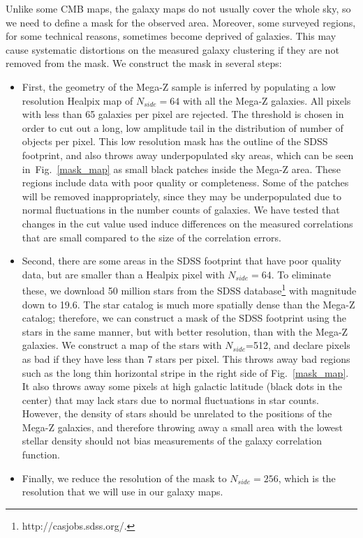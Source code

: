 Unlike some CMB maps, the galaxy maps do not usually cover the whole sky, so we need to define a mask for the observed area. Moreover, some surveyed regions, for some technical reasons, sometimes become deprived of galaxies. This may cause systematic distortions on the measured galaxy clustering if they are not removed from the mask. We construct the mask in several steps:
\begin{itemize}
\item First, the geometry of the Mega-Z sample is inferred by populating a low resolution Healpix map of $N_{side}=64$ with all the Mega-Z galaxies. All pixels with less than 65 galaxies per pixel are rejected.  
The threshold is chosen in order to cut out a long, low amplitude tail in the distribution of number of objects per pixel.
This low resolution mask has the outline of the SDSS footprint, and also throws away underpopulated sky areas, which can be seen in~Fig.~\ref{mask_map} as small black patches inside the Mega-Z area. These regions include data with poor quality or completeness. Some of the patches will be removed inappropriately, since they may be underpopulated due to normal fluctuations in the number counts of galaxies. We have tested that changes in the cut value used induce differences on the measured correlations that are small compared to the size of the correlation errors. 
\item Second, there are some areas in the SDSS footprint that have poor quality data, but are smaller than a Healpix pixel with $N_{side}=64$. To eliminate these, we download 50 million stars from the SDSS database\footnote{http://casjobs.sdss.org/.} with magnitude down to 19.6. The star catalog is much more spatially dense than the Mega-Z catalog;  therefore, we can construct a mask of the SDSS footprint using the stars in the same manner, but with better resolution, than with the Mega-Z galaxies.  We construct a map of the stars with $N_{side}$=512, and declare pixels as bad if they have less than 7 stars per pixel.  This throws away bad regions such as the long thin horizontal stripe in the right side of Fig.~\ref{mask_map}. It also throws away some pixels at high galactic latitude (black dots in the center) that may lack stars due to normal fluctuations in star counts.  However, the density of stars should be unrelated to the positions of the Mega-Z galaxies, and therefore throwing away a small area with the lowest stellar density should not bias measurements of the galaxy correlation function. 
\item Finally, we reduce the resolution of the mask to $N_{side}=256$, which is the resolution that we will use in our galaxy maps.
\end{itemize}
